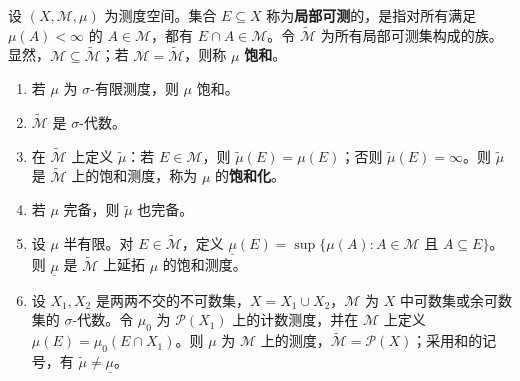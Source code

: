 \documentclass[../../main.tex]{subfiles}%
\begin{document}
\begin{exercise}\label{exercise:ch01-saturation}

\begin{definition*}[局部可测集与饱和测度]
设 $(X,\mathscr{M},\mu)$ 为测度空间。集合 $E\subseteq X$ 称为\textbf{局部可测}的，是指对所有满足 $\mu(A)<\infty$ 的 $A\in\mathscr{M}$，都有 $E\cap A\in\mathscr{M}$。令 $\widetilde{\mathscr{M}}$ 为所有局部可测集构成的族。显然，$\mathscr{M}\subseteq\widetilde{\mathscr{M}}$；若 $\mathscr{M}=\widetilde{\mathscr{M}}$，则称 $\mu$ \textbf{饱和}。
\end{definition*}

\begin{enumerate}[label=\alph*.,ref=(\alph*)]
\item\label{item:ch01-sigma-finite-saturated} 若 $\mu$ 为 $\sigma$-有限测度，则 $\mu$ 饱和。
\item\label{item:ch01-locally-measurable-algebra} $\widetilde{\mathscr{M}}$ 是 $\sigma$-代数。
\item\label{item:ch01-saturation-extension} 在 $\widetilde{\mathscr{M}}$ 上定义 $\widetilde{\mu}$：若 $E\in\mathscr{M}$，则 $\widetilde{\mu}(E)=\mu(E)$；否则 $\widetilde{\mu}(E)=\infty$。则 $\widetilde{\mu}$ 是 $\widetilde{\mathscr{M}}$ 上的饱和测度，称为 $\mu$ 的\textbf{饱和化}。
\item\label{item:ch01-saturation-complete} 若 $\mu$ 完备，则 $\widetilde{\mu}$ 也完备。
\item\label{item:ch01-saturation-semifinite-extension} 设 $\mu$ 半有限。对 $E\in\widetilde{\mathscr{M}}$，定义 $\underline{\mu}(E)=\sup\{\mu(A):A\in\mathscr{M}\text{ 且 }A\subseteq E\}$。则 $\underline{\mu}$ 是 $\widetilde{\mathscr{M}}$ 上延拓 $\mu$ 的饱和测度。
\item\label{item:ch01-saturation-nonunique} 设 $X_1,X_2$ 是两两不交的不可数集，$X=X_1\cup X_2$，$\mathscr{M}$ 为 $X$ 中可数集或余可数集的 $\sigma$-代数。令 $\mu_0$ 为 $\mathscr{P}(X_1)$ 上的计数测度，并在 $\mathscr{M}$ 上定义 $\mu(E)=\mu_0(E\cap X_1)$。则 $\mu$ 为 $\mathscr{M}$ 上的测度，$\widetilde{\mathscr{M}}=\mathscr{P}(X)$；采用和的记号，有 $\widetilde{\mu}\ne\underline{\mu}$。
\end{enumerate}
\end{exercise}
\end{document}
